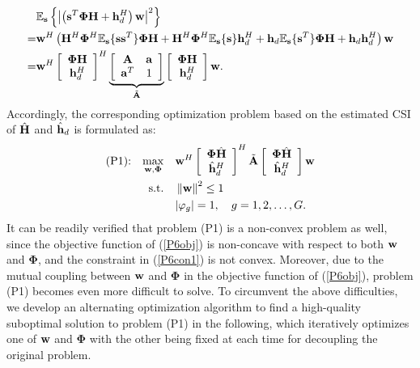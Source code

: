 \documentclass[draftclsnofoot,onecolumn,12pt]{IEEEtran}
\begin{document}
	\begin{align}\notag
	&\mathbb{E}_{\bf s}\left\{ 
	\left|\left({\bf s}^T {\bm \Phi} {{\bf H}} + {{\bf h}}_d^H\right) {\bf w}\right|^2\right\}\\\notag
	=&
	{\bf w}^H \left({{\bf H}^H} {\bm \Phi}^H \mathbb{E}_{\bf s}\{ {\bf s}{\bf s}^T \} {\bm \Phi} {{\bf H}} +{{\bf H}^H} {\bm \Phi}^H \mathbb{E}_{\bf s}\{ {\bf s}\} {{\bf h}}_d^H+ {{\bf h}}_d \mathbb{E}_{\bf s}\{ {\bf s}^T \} {\bm \Phi} {{\bf H}} + {{\bf h}}_d{{\bf h}}_d^H\right) {\bf w}\\
	=&  {\bf w}^H \left[ {\begin{array}{*{20}{c}}
		{\bm \Phi} {{\bf H}}  \\
		{{\bf h}}_d^H 
		\end{array}} \right]^H  \underbrace{ \left[ {\begin{array}{*{20}{c}}
			{\bf A}&{\bf a}\\
			{{\bf a}^T}&{1}
			\end{array}} \right] }_{\tilde{{\bf A}}}  \left[ {\begin{array}{*{20}{c}}
		{\bm \Phi} {{\bf H} } \\
		{{\bf h}}_d^H 
		\end{array}} \right] {\bf w} .\label{ava_received_power4}
	\end{align}
	Accordingly, the corresponding optimization problem based on the estimated CSI of ${\hat{\bf H}}$ and ${\hat{\bf h}}_d$ is formulated as: 
\begin{align}
\text{(P1):} \quad
 \underset{{\bf w},{\bm \Phi}}{\max}
& \quad {\bf w}^H\left[ {\begin{array}{*{20}{c}}
	{{\bm \Phi} \hat{{\bf H}}}\\
	{\hat{{\bf h}}_d^H}
	\end{array}} \right]^H\tilde{\bf A}\left[ {\begin{array}{*{20}{c}}
	{ {\bm \Phi} \hat{{\bf H}}}\\
	{\hat{{\bf h}}_d^H}
	\end{array}} \right]{\bf w} \label{P6obj}\\
 \text{s.t.} & \quad \left\| {\bf w}\right\|^2 \le 1 \label{P6con0}\\
&  \quad |\varphi_{g}|=1, \quad g=1,2,\ldots,G  \label{P6con1}.
\end{align}
It can be readily verified that problem (P1) is a non-convex problem  as well, since the 
objective function of (\ref{P6obj}) is non-concave with respect to both ${\bf w}$ and ${\bm \Phi}$, and the constraint in (\ref{P6con1}) is not convex.
Moreover, due to the mutual coupling between
${\bf w}$ and ${\bm \Phi}$ in the objective function of (\ref{P6obj}), problem (P1) becomes even more difficult to solve. To circumvent the above difficulties, 
we develop an alternating optimization algorithm to find a high-quality suboptimal solution to problem (P1) in the following, which iteratively optimizes one of ${\bf w}$ and ${\bm \Phi}$ with the other being fixed at each time for decoupling the original problem.
\end{document}
